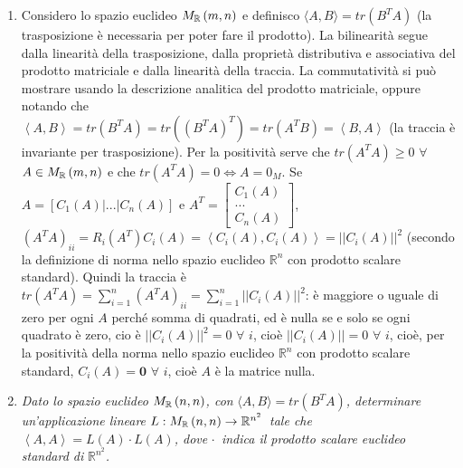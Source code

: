 \documentclass{article}
\begin{document}
\begin{enumerate}
\item Considero lo spazio euclideo $M_{%
\mathbb{R}
}\left( m,n\right) $ e definisco $\langle A,B\mathbf{\rangle }=tr\left(
B^{T}A\right) $ (la trasposizione \`{e} necessaria per poter fare il
prodotto). La bilinearit\`{a} segue dalla linearit\`{a} della trasposizione,
dalla propriet\`{a} distributiva e associativa del prodotto matriciale e
dalla linearit\`{a} della traccia. La commutativit\`{a} si pu\`{o} mostrare
usando la descrizione analitica del prodotto matriciale, oppure notando che $%
\left\langle A,B\right\rangle =tr\left( B^{T}A\right) =tr\left( \left(
B^{T}A\right) ^{T}\right) =tr\left( A^{T}B\right) =\left\langle
B,A\right\rangle $ (la traccia \`{e} invariante per trasposizione). Per la
positivit\`{a} serve che $tr\left( A^{T}A\right) \geq 0$ $\forall $ $A\in M_{%
\mathbb{R}
}\left( m,n\right) $ e che $tr\left( A^{T}A\right) =0\Longleftrightarrow
A=0_{M}$. Se $A=\left[ C_{1}\left( A\right) |...|C_{n}\left( A\right) \right]
$ e $A^{T}=\left[ 
\begin{array}{c}
C_{1}\left( A\right) \\ 
... \\ 
C_{n}\left( A\right)%
\end{array}%
\right] $, $\left( A^{T}A\right) _{ii}=R_{i}\left( A^{T}\right) C_{i}\left(
A\right) =\left\langle C_{i}\left( A\right) ,C_{i}\left( A\right)
\right\rangle =\left\vert \left\vert C_{i}\left( A\right) \right\vert
\right\vert ^{2}$ (secondo la definizione di norma nello spazio euclideo $%
\mathbb{R}
^{n}$ con prodotto scalare standard). Quindi la traccia \`{e} $tr\left(
A^{T}A\right) =\sum_{i=1}^{n}\left( A^{T}A\right)
_{ii}=\sum_{i=1}^{n}\left\vert \left\vert C_{i}\left( A\right) \right\vert
\right\vert ^{2}$: \`{e} maggiore o uguale di zero per ogni $A$ perch\'{e}
somma di quadrati, ed \`{e} nulla se e solo se ogni quadrato \`{e} zero, cio%
\`{e} $\left\vert \left\vert C_{i}\left( A\right) \right\vert \right\vert
^{2}=0$ $\forall $ $i$, cio\`{e} $\left\vert \left\vert C_{i}\left( A\right)
\right\vert \right\vert =0$ $\forall $ $i$, cio\`{e}, per la positivit\`{a}
della norma nello spazio euclideo $%
\mathbb{R}
^{n}$ con prodotto scalare standard, $C_{i}\left( A\right) =\mathbf{0}$ $%
\forall $ $i$, cio\`{e} $A$ \`{e} la matrice nulla.

\item \textit{Dato lo spazio euclideo }$M_{%
\mathbb{R}
}\left( n,n\right) $\textit{, con }$\langle A,B\rangle =tr\left(
B^{T}A\right) $\textit{, determinare un'applicazione lineare }$L:M_{%
\mathbb{R}
}\left( n,n\right) \rightarrow 
\mathbb{R}
^{n^{2}}$\textit{\ tale che }$\left\langle A,A\right\rangle =L\left(
A\right) \cdot L\left( A\right) $\textit{, dove }$\cdot $\textit{\ indica il
prodotto scalare euclideo standard di }$%
\mathbb{R}
^{n^{2}}$\textit{.}


\end{enumerate}
\end{document}

